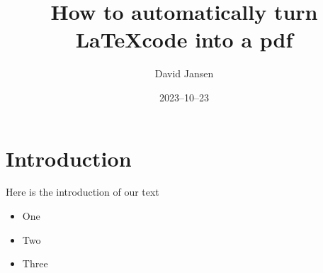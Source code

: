 \documentclass[12pt]{article}
\title{How to automatically turn \LaTeX code into a pdf}
\author{David Jansen}
\date{2023–10–23}
\begin{document}
\maketitle

\section{Introduction}

Here is the introduction of our text

\begin{itemize}

\item One

\item Two

\item Three

\end{itemize}
\end{document}

